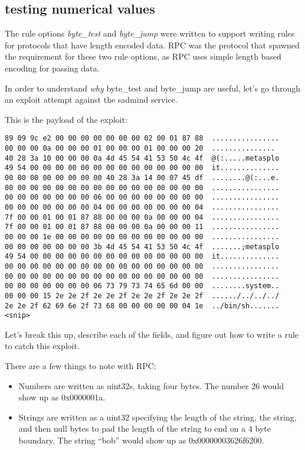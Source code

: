 \documentclass[english]{report}
\begin{document}
\subsection{testing numerical values \label{testing numerical values}}
The rule options \emph{byte\_test} and \emph{byte\_jump} were written to
support writing rules for protocols that have length encoded data.  RPC was the 
protocol that spawned the requirement for these two rule options, as RPC uses simple 
length based encoding for passing data.

In order to understand \emph{why} byte\_test and byte\_jump are useful, let's go
through an exploit attempt against the sadmind service.

This is the payload of the exploit:

\begin{verbatim}
89 09 9c e2 00 00 00 00 00 00 00 02 00 01 87 88  ................
00 00 00 0a 00 00 00 01 00 00 00 01 00 00 00 20  ...............
40 28 3a 10 00 00 00 0a 4d 45 54 41 53 50 4c 4f  @(:.....metasplo
49 54 00 00 00 00 00 00 00 00 00 00 00 00 00 00  it..............
00 00 00 00 00 00 00 00 40 28 3a 14 00 07 45 df  ........@(:...e.
00 00 00 00 00 00 00 00 00 00 00 00 00 00 00 00  ................
00 00 00 00 00 00 00 06 00 00 00 00 00 00 00 00  ................
00 00 00 00 00 00 00 04 00 00 00 00 00 00 00 04  ................
7f 00 00 01 00 01 87 88 00 00 00 0a 00 00 00 04  ................
7f 00 00 01 00 01 87 88 00 00 00 0a 00 00 00 11  ................
00 00 00 1e 00 00 00 00 00 00 00 00 00 00 00 00  ................
00 00 00 00 00 00 00 3b 4d 45 54 41 53 50 4c 4f  .......;metasplo
49 54 00 00 00 00 00 00 00 00 00 00 00 00 00 00  it..............
00 00 00 00 00 00 00 00 00 00 00 00 00 00 00 00  ................
00 00 00 00 00 00 00 00 00 00 00 00 00 00 00 00  ................
00 00 00 00 00 00 00 06 73 79 73 74 65 6d 00 00  ........system..
00 00 00 15 2e 2e 2f 2e 2e 2f 2e 2e 2f 2e 2e 2f  ....../../../../
2e 2e 2f 62 69 6e 2f 73 68 00 00 00 00 00 04 1e  ../bin/sh.......
<snip>
\end{verbatim}

Let's break this up, describe each of the fields, and figure out
how to write a rule to catch this exploit.  


There are a few things to note with RPC:
\begin{itemize}
\item Numbers are written as uint32s, taking four bytes.  The number 26 would show up as 0x0000001a.
\item Strings are written as a uint32 specifying the length of the string, the string, and then null bytes to pad the length of the string to end on a 4 byte boundary.  The string ``bob'' would show up as 0x00000003626f6200.
\end{itemize}
\end{document}
